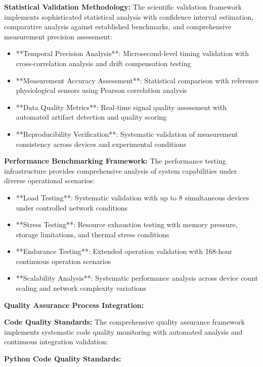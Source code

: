 \documentclass[12pt,a4paper]{article}
\begin{document}
\textbf{Statistical Validation Methodology:}
The scientific validation framework implements sophisticated statistical analysis with confidence interval estimation,
comparative analysis against established benchmarks, and comprehensive measurement precision assessment:

\begin{itemize}
\item **Temporal Precision Analysis**: Microsecond-level timing validation with cross-correlation analysis and drift
  compensation testing
\item **Measurement Accuracy Assessment**: Statistical comparison with reference physiological sensors using Pearson
  correlation analysis
\item **Data Quality Metrics**: Real-time signal quality assessment with automated artifact detection and quality scoring
\item **Reproducibility Verification**: Systematic validation of measurement consistency across devices and experimental
  conditions

\end{itemize}
\textbf{Performance Benchmarking Framework:}
The performance testing infrastructure provides comprehensive analysis of system capabilities under diverse operational
scenarios:

\begin{itemize}
\item **Load Testing**: Systematic validation with up to 8 simultaneous devices under controlled network conditions
\item **Stress Testing**: Resource exhaustion testing with memory pressure, storage limitations, and thermal stress
  conditions
\item **Endurance Testing**: Extended operation validation with 168-hour continuous operation scenarios
\item **Scalability Analysis**: Systematic performance analysis across device count scaling and network complexity
  variations

\end{itemize}
\textbf{Quality Assurance Process Integration:}

\textbf{Code Quality Standards:}
The comprehensive quality assurance framework implements systematic code quality monitoring with automated analysis and
continuous integration validation:

\textbf{Python Code Quality Standards:}
\end{document}
